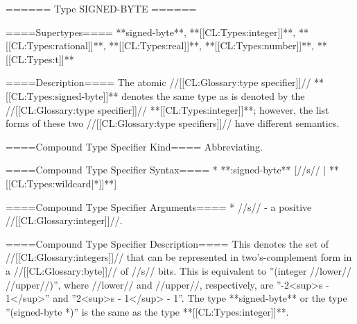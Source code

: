 ====== Type SIGNED-BYTE ======

====Supertypes====
**signed-byte**, **[[CL:Types:integer]]**, **[[CL:Types:rational]]**, **[[CL:Types:real]]**, **[[CL:Types:number]]**, **[[CL:Types:t]]**

====Description====
The atomic //[[CL:Glossary:type specifier]]// **[[CL:Types:signed-byte]]** denotes the same type as is denoted by the //[[CL:Glossary:type specifier]]// **[[CL:Types:integer]]**; however, the list forms of these two //[[CL:Glossary:type specifiers]]// have different semantics.

====Compound Type Specifier Kind====
Abbreviating.

====Compound Type Specifier Syntax====
  * **:signed-byte** [//s// | **[[CL:Types:wildcard|*]]**]

====Compound Type Specifier Arguments====
  * //s// - a positive //[[CL:Glossary:integer]]//.

====Compound Type Specifier Description====
This denotes the set of //[[CL:Glossary:integers]]// that can be represented in two's-complement form in a //[[CL:Glossary:byte]]// of //s// bits. This is equivalent to ''(integer //lower// //upper//)'', where //lower// and //upper//, respectively, are ''-2<sup>s - 1</sup>'' and  ''2<sup>s - 1</sup> - 1''. The type **signed-byte** or the type ''(signed-byte *)'' is the same as the type **[[CL:Types:integer]]**.

